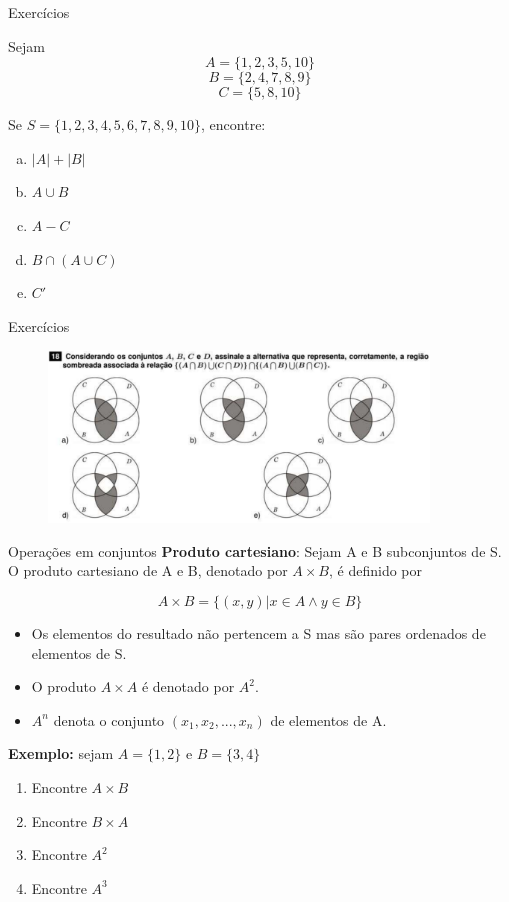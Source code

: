 \documentclass[aspectratio=169]{beamer}
\begin{document}
\begin{frame}{Exercícios}

    Sejam
\[ A = \{1,2,3,5,10\} \]
\[ B = \{2,4,7,8,9\} \]
\[ C = \{5,8,10\} \]

Se $S=\{1,2,3,4,5,6,7,8,9,10\}$, encontre:

\begin{enumerate}[a)]   
    \item $|A| + |B|$
    \item $A \cup B$
    \item $A - C$
    \item $B \cap (A \cup C)$
    \item $C'$
\end{enumerate}
\end{frame}


\begin{frame}{Exercícios}
\begin{figure}
    \includegraphics[width=0.9\textwidth]{./figs/poscomp18-cropped.pdf}
\end{figure}
\end{frame}


\begin{frame}{Operações em conjuntos}
    \textbf{Produto cartesiano}: Sejam A e B subconjuntos de S. O produto cartesiano de A e B, denotado por $A \times B$, é definido por

    \[ A \times B = \{(x, y)|x \in A \wedge y \in B\}\]

    \begin{itemize}
        \item Os elementos do resultado não pertencem a S mas são pares ordenados de elementos de S.
        \item O produto $A \times A$ é denotado por $A^2$.
        \item $A^n$ denota o conjunto $(x_1, x_2, ..., x_n)$ de elementos de
        A.
    \end{itemize}

    \textbf{Exemplo:} sejam $A=\{1,2\}$ e $B=\{3,4\}$

    \begin{multicols}{2}
    \begin{enumerate}
        \item Encontre $A \times B$
        \item Encontre $B \times A$
        \item Encontre $A^2$
        \item Encontre $A^3$
    \end{enumerate}
\end{multicols}

\end{frame}
\end{document}
